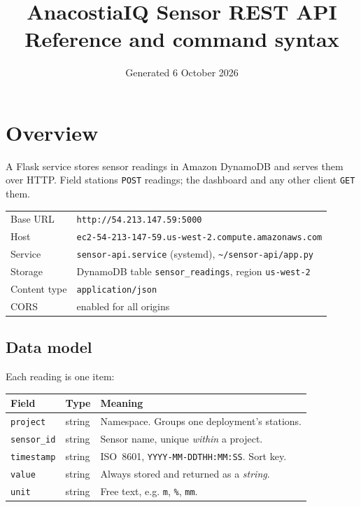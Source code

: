\documentclass[11pt,a4paper]{article}
\title{\textbf{AnacostiaIQ Sensor REST API}\\[2mm]
       \large Reference and command syntax}
\author{}
\date{Generated 6 October 2026}
\begin{document}
\maketitle
\tableofcontents
\bigskip

\section{Overview}

A Flask service stores sensor readings in Amazon DynamoDB and serves them
over HTTP. Field stations \texttt{POST} readings; the dashboard and any
other client \texttt{GET} them.

\begin{center}
\begin{tabular}{@{}ll@{}}
\toprule
Base URL        & \texttt{http://54.213.147.59:5000} \\
Host            & \texttt{ec2-54-213-147-59.us-west-2.compute.amazonaws.com} \\
Service         & \texttt{sensor-api.service} (systemd), \texttt{\textasciitilde/sensor-api/app.py} \\
Storage         & DynamoDB table \texttt{sensor\_readings}, region \texttt{us-west-2} \\
Content type    & \texttt{application/json} \\
CORS            & enabled for all origins \\
\bottomrule
\end{tabular}
\end{center}

\subsection{Data model}

Each reading is one item:

\begin{center}
\begin{tabular}{@{}llp{7.6cm}@{}}
\toprule
Field & Type & Meaning \\
\midrule
\texttt{project}   & string & Namespace. Groups one deployment's stations. \\
\texttt{sensor\_id}& string & Sensor name, unique \emph{within} a project. \\
\texttt{timestamp} & string & ISO~8601, \texttt{YYYY-MM-DDTHH:MM:SS}. Sort key. \\
\texttt{value}     & string & Always stored and returned as a \emph{string}. \\
\texttt{unit}      & string & Free text, e.g. \texttt{m}, \texttt{\%}, \texttt{mm}. \\
\bottomrule
\end{tabular}
\end{center}
\end{document}
